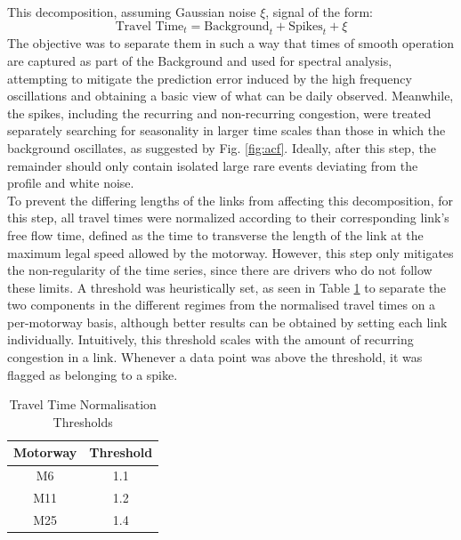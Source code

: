 \documentclass[conference, letterpaper]{IEEEtran}
\begin{document}
This decomposition, assuming Gaussian noise $\xi$, signal of the form:
\begin{equation}
\textrm{Travel Time}_t  = \textrm{Background}_t + \textrm{Spikes}_t + \xi
\end{equation}
The objective was to separate them in such a way that times of smooth operation are captured as part of the Background and used for spectral analysis, attempting to mitigate the prediction error induced by the high frequency oscillations and obtaining a basic view of what can be daily observed.
Meanwhile, the spikes, including the recurring and non-recurring congestion, were treated separately searching for seasonality in larger time scales than those in which the background oscillates, as suggested by Fig. \ref{fig:acf}. 
Ideally, after this step, the remainder should only contain isolated large rare events deviating from the profile and white noise.\\

To prevent the differing lengths of the links from affecting this decomposition, for this step, all travel times were normalized according to their corresponding link's free flow time, defined as the time to transverse the length of the link at the maximum legal speed allowed by the motorway. 
However, this step only mitigates the non-regularity of the time series, since there are drivers who do not follow these limits.
A threshold was heuristically set, as seen in Table \ref{table:threshold}  to separate the two components in the different regimes from the normalised travel times on a per-motorway basis, although better results can be obtained by setting each link individually. 
Intuitively, this threshold scales with the amount of recurring congestion in a link. Whenever a data point was above the threshold, it was flagged as belonging to a spike.
\begin{table}[htbp]
	\caption{Travel Time Normalisation Thresholds}
	\begin{center}
		\begin{tabular}{|c|c|}
			\hline
			\textbf{Motorway}&{\textbf{Threshold}} \\
			\hline
			M6& 1.1\\
			\hline
			M11& 1.2\\
			\hline
			M25& 1.4\\
			\hline
		\end{tabular}
		\label{table:threshold}
	\end{center}
\end{table}
\end{document}
